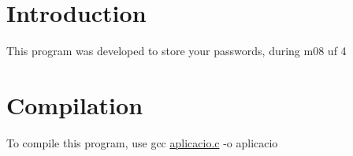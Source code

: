\hypertarget{index_intro_sec}{}\section{Introduction}\label{index_intro_sec}
This program was developed to store your passwords, during m08 uf 4 \hypertarget{index_compile_sec}{}\section{Compilation}\label{index_compile_sec}
To compile this program, use gcc \hyperlink{aplicacio_8c}{aplicacio.\+c} -\/o aplicacio 